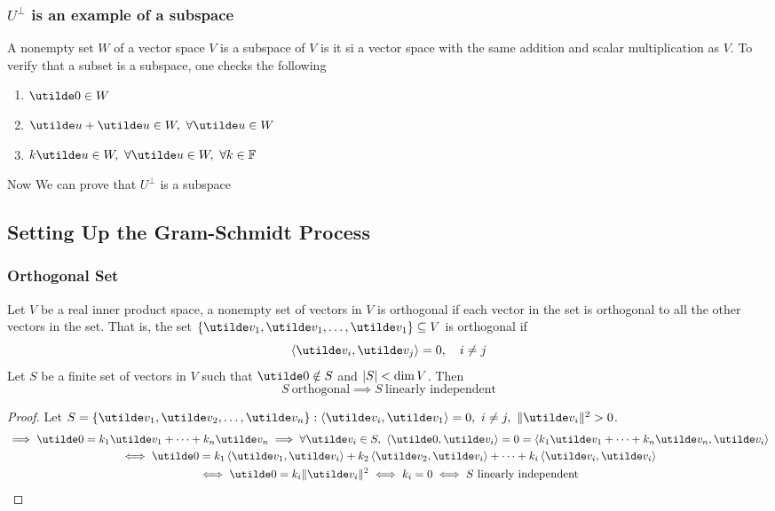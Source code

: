 \documentclass{report}
\begin{document}
\subsubsection{$U^\perp$ is an example of a subspace}
A nonempty set $W$ of a vector space $V$ is a subspace of $V$ is it si a vector space with the same addition and scalar multiplication as $V$. To verify that a subset is a subspace, one checks the following
\begin{enumerate}[label=(\arabic*)]
  \item $\ut{0} \in W$
  \item $\ut{u} + \ut{u} \in W,\ \forall\ut{u}\in W$
  \item $k\ut{u}\in W,\ \forall\ut{u}\in W,\ \forall k\in\bbf$
\end{enumerate}
Now We can prove that $U^\perp$ is a subspace

\subsection{Setting Up the Gram-Schmidt Process}
\subsubsection{Orthogonal Set}
Let $V$ be a real inner product space, a nonempty set of vectors in $V$ is orthogonal if each vector in the set is orthogonal to all the other vectors in the set. That is, the set $\braces{\ut{v}_1,\ut{v}_1,\dots,\ut{v}_1}\subseteq V$ is orthogonal if
$$
  \brangle{\ut{v}_i,\ut{v}_j} = 0,\quad i\neq j
$$
Let $S$ be a finite set of vectors in $V$ such that $\ut{0}\notin S$ and $\left| S \right| < \dim V$. Then
$$
  S\ \text{orthogonal} \implies S\ \text{linearly independent}
$$
\begin{proof}
  Let $S=\braces{\ut{v}_1, \ut{v}_2, \dots, \ut{v}_n}: \brangle{\ut{v}_i, \ut{v}_1} = 0,\ i\neq j,\ \norm{\ut{v}_i}^2 > 0$.
  \begin{gather*}
    \implies \ut{0} = k_1\ut{v}_1 + \dots + k_n\ut{v}_n  \implies \forall \ut{v}_i\in S,\ \brangle{\ut{0}, \ut{v}_i} = 0 = \brangle{k_1\ut{v}_1 + \dots + k_n\ut{v}_n, \ut{v}_i} \\
    \iff \ut{0} = k_1\brangle{\ut{v}_1,\ut{v}_i} + k_2\brangle{\ut{v}_2,\ut{v}_i} + \dots + k_i\brangle{\ut{v}_i,\ut{v}_i} \\
    \iff \ut{0} = k_i\norm{\ut{v}_i}^2 \iff k_i = 0 \iff S\ \text{linearly independent}
  \end{gather*}
\end{proof}
\end{document}
